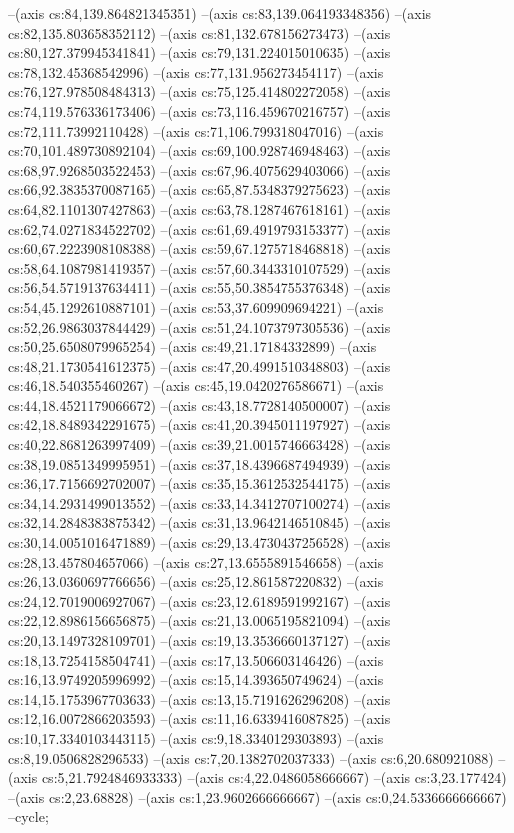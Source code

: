 --(axis cs:84,139.864821345351)
--(axis cs:83,139.064193348356)
--(axis cs:82,135.803658352112)
--(axis cs:81,132.678156273473)
--(axis cs:80,127.379945341841)
--(axis cs:79,131.224015010635)
--(axis cs:78,132.45368542996)
--(axis cs:77,131.956273454117)
--(axis cs:76,127.978508484313)
--(axis cs:75,125.414802272058)
--(axis cs:74,119.576336173406)
--(axis cs:73,116.459670216757)
--(axis cs:72,111.73992110428)
--(axis cs:71,106.799318047016)
--(axis cs:70,101.489730892104)
--(axis cs:69,100.928746948463)
--(axis cs:68,97.9268503522453)
--(axis cs:67,96.4075629403066)
--(axis cs:66,92.3835370087165)
--(axis cs:65,87.5348379275623)
--(axis cs:64,82.1101307427863)
--(axis cs:63,78.1287467618161)
--(axis cs:62,74.0271834522702)
--(axis cs:61,69.4919793153377)
--(axis cs:60,67.2223908108388)
--(axis cs:59,67.1275718468818)
--(axis cs:58,64.1087981419357)
--(axis cs:57,60.3443310107529)
--(axis cs:56,54.5719137634411)
--(axis cs:55,50.3854755376348)
--(axis cs:54,45.1292610887101)
--(axis cs:53,37.609909694221)
--(axis cs:52,26.9863037844429)
--(axis cs:51,24.1073797305536)
--(axis cs:50,25.6508079965254)
--(axis cs:49,21.17184332899)
--(axis cs:48,21.1730541612375)
--(axis cs:47,20.4991510348803)
--(axis cs:46,18.540355460267)
--(axis cs:45,19.0420276586671)
--(axis cs:44,18.4521179066672)
--(axis cs:43,18.7728140500007)
--(axis cs:42,18.8489342291675)
--(axis cs:41,20.3945011197927)
--(axis cs:40,22.8681263997409)
--(axis cs:39,21.0015746663428)
--(axis cs:38,19.0851349995951)
--(axis cs:37,18.4396687494939)
--(axis cs:36,17.7156692702007)
--(axis cs:35,15.3612532544175)
--(axis cs:34,14.2931499013552)
--(axis cs:33,14.3412707100274)
--(axis cs:32,14.2848383875342)
--(axis cs:31,13.9642146510845)
--(axis cs:30,14.0051016471889)
--(axis cs:29,13.4730437256528)
--(axis cs:28,13.457804657066)
--(axis cs:27,13.6555891546658)
--(axis cs:26,13.0360697766656)
--(axis cs:25,12.861587220832)
--(axis cs:24,12.7019006927067)
--(axis cs:23,12.6189591992167)
--(axis cs:22,12.8986156656875)
--(axis cs:21,13.0065195821094)
--(axis cs:20,13.1497328109701)
--(axis cs:19,13.3536660137127)
--(axis cs:18,13.7254158504741)
--(axis cs:17,13.506603146426)
--(axis cs:16,13.9749205996992)
--(axis cs:15,14.393650749624)
--(axis cs:14,15.1753967703633)
--(axis cs:13,15.7191626296208)
--(axis cs:12,16.0072866203593)
--(axis cs:11,16.6339416087825)
--(axis cs:10,17.3340103443115)
--(axis cs:9,18.3340129303893)
--(axis cs:8,19.0506828296533)
--(axis cs:7,20.1382702037333)
--(axis cs:6,20.680921088)
--(axis cs:5,21.7924846933333)
--(axis cs:4,22.0486058666667)
--(axis cs:3,23.177424)
--(axis cs:2,23.68828)
--(axis cs:1,23.9602666666667)
--(axis cs:0,24.5336666666667)
--cycle;

